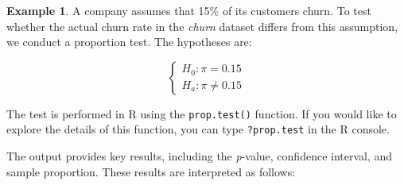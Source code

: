 \documentclass[
  11pt,
]{book}
\makeatletter
\newenvironment{Shaded}{}{}
\newcommand{\AttributeTok}[1]{#1}
\newcommand{\DecValTok}[1]{#1}
\newcommand{\FloatTok}[1]{#1}
\newcommand{\FunctionTok}[1]{#1}
\newcommand{\NormalTok}[1]{#1}
\newcommand{\OtherTok}[1]{\textcolor[rgb]{0.39,0.39,0.39}{#1}}
\newcommand{\SpecialCharTok}[1]{\textcolor[rgb]{0.39,0.39,0.39}{#1}}
\newcommand{\StringTok}[1]{\textcolor[rgb]{0.39,0.39,0.39}{#1}}
\newenvironment{kframe}{%
\medskip{}
\setlength{\fboxsep}{.8em}
 \def\at@end@of@kframe{}%
 \ifinner\ifhmode%
  \def\at@end@of@kframe{\end{minipage}}%
  \begin{minipage}{\columnwidth}%
 \fi\fi%
 \def\FrameCommand##1{\hskip\@totalleftmargin \hskip-\fboxsep
 \colorbox{shadecolor}{##1}\hskip-\fboxsep
     \hskip-\linewidth \hskip-\@totalleftmargin \hskip\columnwidth}%
 \MakeFramed {\advance\hsize-\width
   \@totalleftmargin\z@ \linewidth\hsize
   \@setminipage}}%
 {\par\unskip\endMakeFramed%
 \at@end@of@kframe}
\renewenvironment{Shaded}{\begin{kframe}}{\end{kframe}}
\theoremstyle{definition}
\theoremstyle{definition}
\newtheorem{example}{Example}[chapter]
\theoremstyle{definition}
\theoremstyle{definition}
\theoremstyle{remark}
\makeatother
\begin{document}
\begin{example}
\protect\hypertarget{exm:ex-test-proportion}{}\label{exm:ex-test-proportion}A company assumes that 15\% of its customers churn. To test whether the actual churn rate in the \emph{churn} dataset differs from this assumption, we conduct a proportion test. The hypotheses are:

\[
\begin{cases}
H_0: \pi  =   0.15 \\ 
H_a: \pi \neq 0.15 
\end{cases}
\]

The test is performed in R using the \texttt{prop.test()} function. If you would like to explore the details of this function, you can type \texttt{?prop.test} in the R console.

\begin{Shaded}
\end{Shaded}

The output provides key results, including the \emph{p}-value, confidence interval, and sample proportion. These results are interpreted as follows:


\end{example}
\end{document}
